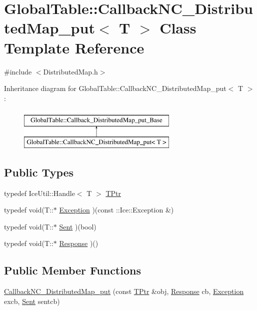 \hypertarget{class_global_table_1_1_callback_n_c___distributed_map__put}{
\section{GlobalTable::CallbackNC\_\-DistributedMap\_\-put$<$ T $>$ Class Template Reference}
\label{class_global_table_1_1_callback_n_c___distributed_map__put}
}


{\ttfamily \#include $<$DistributedMap.h$>$}

Inheritance diagram for GlobalTable::CallbackNC\_\-DistributedMap\_\-put$<$ T $>$:\begin{figure}[H]
\begin{center}
\leavevmode
\includegraphics[height=2cm]{class_global_table_1_1_callback_n_c___distributed_map__put}
\end{center}
\end{figure}
\subsection*{Public Types}
\begin{DoxyCompactItemize}
\item 
typedef IceUtil::Handle$<$ T $>$ \hyperlink{class_global_table_1_1_callback_n_c___distributed_map__put_aac571ffa85d8997eaeb5d30bf47e1f73}{TPtr}
\item 
typedef void(T::$\ast$ \hyperlink{class_global_table_1_1_callback_n_c___distributed_map__put_a9fd25c1d1aa2b2070e3fa23e8ee424b1}{Exception} )(const ::Ice::Exception \&)
\item 
typedef void(T::$\ast$ \hyperlink{class_global_table_1_1_callback_n_c___distributed_map__put_a166741a62eb027de0db09fd0a8fd505d}{Sent} )(bool)
\item 
typedef void(T::$\ast$ \hyperlink{class_global_table_1_1_callback_n_c___distributed_map__put_a1816d1339bc29436046f61c3fddd3d79}{Response} )()
\end{DoxyCompactItemize}
\subsection*{Public Member Functions}
\begin{DoxyCompactItemize}
\item 
\hyperlink{class_global_table_1_1_callback_n_c___distributed_map__put_ab670ca51d46ab25d3e2dc1085a6283a4}{CallbackNC\_\-DistributedMap\_\-put} (const \hyperlink{class_global_table_1_1_callback_n_c___distributed_map__put_aac571ffa85d8997eaeb5d30bf47e1f73}{TPtr} \&obj, \hyperlink{class_global_table_1_1_callback_n_c___distributed_map__put_a1816d1339bc29436046f61c3fddd3d79}{Response} cb, \hyperlink{class_global_table_1_1_callback_n_c___distributed_map__put_a9fd25c1d1aa2b2070e3fa23e8ee424b1}{Exception} excb, \hyperlink{class_global_table_1_1_callback_n_c___distributed_map__put_a166741a62eb027de0db09fd0a8fd505d}{Sent} sentcb)
\end{DoxyCompactItemize}
